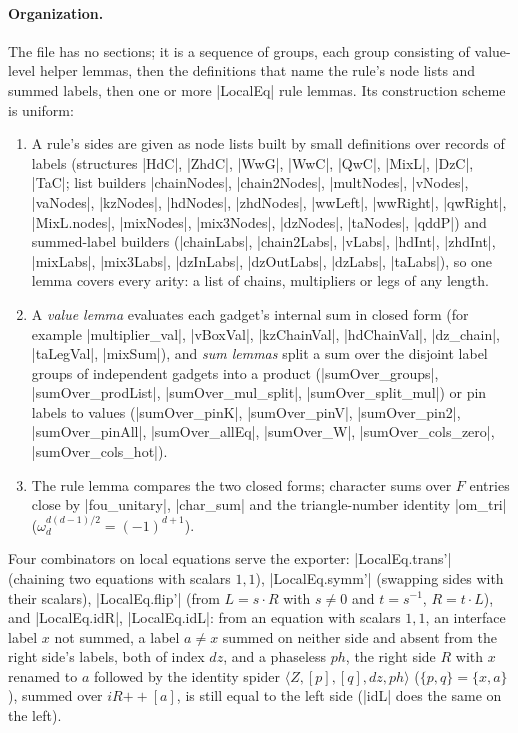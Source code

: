 \paragraph{Organization.} The file has no sections; it is a sequence of groups, each group
consisting of value-level helper lemmas, then the definitions that name the rule's node lists and
summed labels, then one or more \lean|LocalEq| rule lemmas. Its construction scheme is uniform:
\begin{enumerate}
\item A rule's sides are given as node lists built by small definitions over records of labels
  (structures \lean|HdC|, \lean|ZhdC|, \lean|WwG|, \lean|WwC|, \lean|QwC|, \lean|MixL|,
  \lean|DzC|, \lean|TaC|; list builders \lean|chainNodes|, \lean|chain2Nodes|, \lean|multNodes|,
  \lean|vNodes|, \lean|vaNodes|, \lean|kzNodes|, \lean|hdNodes|, \lean|zhdNodes|, \lean|wwLeft|,
  \lean|wwRight|, \lean|qwRight|, \lean|MixL.nodes|, \lean|mixNodes|, \lean|mix3Nodes|,
  \lean|dzNodes|, \lean|taNodes|, \lean|qddP|) and summed-label builders (\lean|chainLabs|,
  \lean|chain2Labs|, \lean|vLabs|, \lean|hdInt|, \lean|zhdInt|, \lean|mixLabs|, \lean|mix3Labs|,
  \lean|dzInLabs|, \lean|dzOutLabs|, \lean|dzLabs|, \lean|taLabs|), so one lemma covers every
  arity: a list of chains, multipliers or legs of any length.
\item A \emph{value lemma} evaluates each gadget's internal sum in closed form (for example
  \lean|multiplier_val|, \lean|vBoxVal|, \lean|kzChainVal|, \lean|hdChainVal|, \lean|dz_chain|,
  \lean|taLegVal|, \lean|mixSum|), and \emph{sum lemmas} split a sum over the disjoint label groups
  of independent gadgets into a product (\lean|sumOver_groups|, \lean|sumOver_prodList|,
  \lean|sumOver_mul_split|, \lean|sumOver_split_mul|) or pin labels to values
  (\lean|sumOver_pinK|, \lean|sumOver_pinV|, \lean|sumOver_pin2|, \lean|sumOver_pinAll|,
  \lean|sumOver_allEq|, \lean|sumOver_W|, \lean|sumOver_cols_zero|, \lean|sumOver_cols_hot|).
\item The rule lemma compares the two closed forms; character sums over $F$ entries close by
  \lean|fou_unitary|, \lean|char_sum| and the triangle-number identity \lean|om_tri|
  ($\omega_d^{d(d-1)/2}=(-1)^{d+1}$).
\end{enumerate}
Four combinators on local equations serve the exporter:
\lean|LocalEq.trans'| (chaining two equations with scalars $1,1$), \lean|LocalEq.symm'| (swapping
sides with their scalars), \lean|LocalEq.flip'| (from $L=s\cdot R$ with $s\ne0$ and $t=s^{-1}$,
$R=t\cdot L$), and \lean|LocalEq.idR|, \lean|LocalEq.idL|: from an equation with scalars $1,1$, an
interface label $x$ not summed, a label $a\ne x$ summed on neither side and absent from the right
side's labels, both of index $dz$, and a phaseless $ph$, the right side $R$ with $x$ renamed to $a$
followed by the identity spider $\langle Z,[p],[q],dz,ph\rangle$ ($\{p,q\}=\{x,a\}$), summed over
$iR\mathbin{+\!\!+}[a]$, is still equal to the left side (\lean|idL| does the same on the left).

